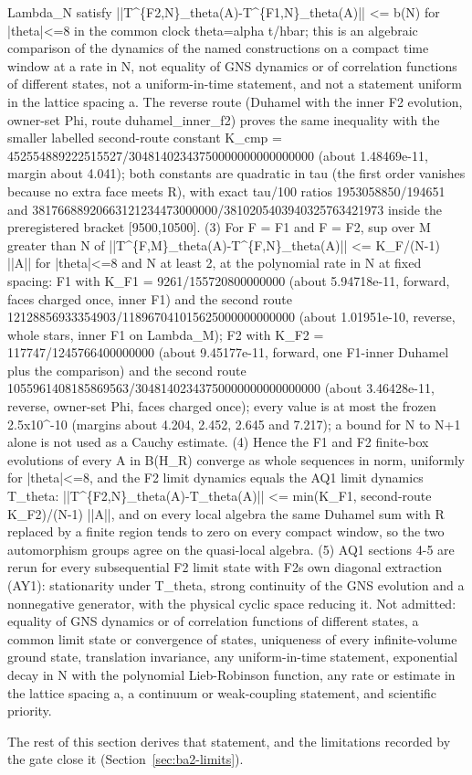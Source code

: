 \begin{gatequote}
Lambda\_N satisfy
||T\textasciicircum{}\{F2,N\}\_theta(A)-T\textasciicircum{}\{F1,N\}\_theta(A)||
<= b(N) for |theta|<=8 in the common clock theta=alpha t/hbar; this is an
algebraic comparison of the dynamics of the named constructions on a compact
time window at a rate in N, not equality of GNS dynamics or of correlation
functions of different states, not a uniform-in-time statement, and not a
statement uniform in the lattice spacing a. The reverse route (Duhamel with
the inner F2 evolution, owner-set Phi\textquotesingle{}, route
duhamel\_inner\_f2) proves the same inequality with the smaller labelled
second-route constant K\textquotesingle{}\_cmp =
452554889222515527/30481402343750000000000000000 (about 1.48469e-11, margin
about 4.041); both constants are quadratic in tau (the first order vanishes
because no extra face meets R), with exact tau/100 ratios 1953058850/194651
and 38176688920663121234473000000/3810205403940325763421973 inside the
preregistered bracket [9500,10500]. (3) For F = F1 and F = F2, sup over M
greater than N of
||T\textasciicircum{}\{F,M\}\_theta(A)-T\textasciicircum{}\{F,N\}\_theta(A)||
<= K\_F/(N-1) ||A|| for |theta|<=8 and N at least 2, at the polynomial rate in
N at fixed spacing: F1 with K\_F1 = 9261/155720800000000 (about 5.94718e-11,
forward, faces charged once, inner F1) and the second route
12128856933354903/118967041015625000000000000 (about 1.01951e-10, reverse,
whole stars, inner F1 on Lambda\_M); F2 with K\_F2 = 117747/1245766400000000
(about 9.45177e-11, forward, one F1-inner Duhamel plus the comparison) and the
second route 1055961408185869563/30481402343750000000000000000 (about
3.46428e-11, reverse, owner-set Phi\textquotesingle{}, faces charged once);
every value is at most the frozen 2.5x10\textasciicircum{}-10 (margins about
4.204, 2.452, 2.645 and 7.217); a bound for N to N+1 alone is not used as a
Cauchy estimate. (4) Hence the F1 and F2 finite-box evolutions of every A in
B(H\_R) converge as whole sequences in norm, uniformly for |theta|<=8, and the
F2 limit dynamics equals the AQ1 limit dynamics T\_theta:
||T\textasciicircum{}\{F2,N\}\_theta(A)-T\_theta(A)|| <= min(K\_F1,
second-route K\_F2)/(N-1) ||A||, and on every local algebra the same Duhamel
sum with R replaced by a finite region tends to zero on every compact window,
so the two automorphism groups agree on the quasi-local algebra. (5) AQ1
sections 4-5 are rerun for every subsequential F2 limit state with
F2\textquotesingle{}s own diagonal extraction (AY1): stationarity under
T\_theta, strong continuity of the GNS evolution and a nonnegative generator,
with the physical cyclic space reducing it. Not admitted: equality of GNS
dynamics or of correlation functions of different states, a common limit state
or convergence of states, uniqueness of every infinite-volume ground state,
translation invariance, any uniform-in-time statement, exponential decay in N
with the polynomial Lieb-Robinson function, any rate or estimate in the
lattice spacing a, a continuum or weak-coupling statement, and scientific
priority.
\end{gatequote}
The rest of this section derives that statement, and the limitations recorded
by the gate close it (Section~\ref{sec:ba2-limits}).

